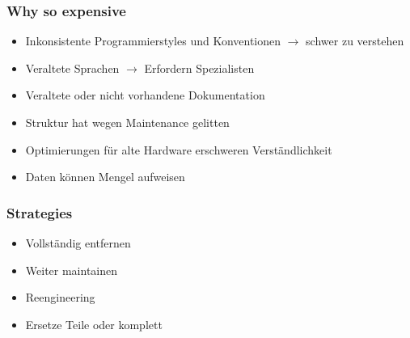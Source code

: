 \subsubsection{Why so expensive}
\begin{itemize}
	\item Inkonsistente Programmierstyles und Konventionen $\to$ schwer zu verstehen
	\item Veraltete Sprachen $\to$ Erfordern Spezialisten
	\item Veraltete oder nicht vorhandene Dokumentation
	\item Struktur hat wegen Maintenance gelitten
	\item Optimierungen für alte Hardware erschweren Verständlichkeit 
	\item Daten können Mengel aufweisen
\end{itemize}
\subsubsection{Strategies}
\begin{itemize}
	\item Vollständig entfernen
	\item Weiter maintainen
	\item Reengineering
	\item Ersetze Teile oder komplett
\end{itemize}





